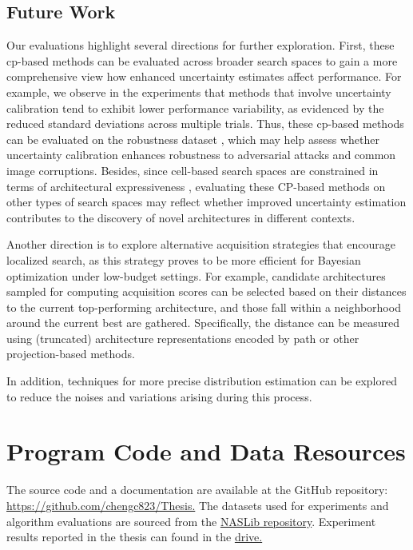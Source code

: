 \documentclass[a4paper,oneside,bibliography=totoc]{scrbook}
\begin{document}
\section{Future Work}
\label{sec: future_work}
Our evaluations highlight several directions for further exploration. First, these \gls{cp}-based methods can be evaluated across broader search spaces to gain a more comprehensive view how enhanced uncertainty estimates affect performance. For example, we observe in the experiments that methods that involve uncertainty calibration tend to exhibit lower performance variability, as evidenced by the reduced standard deviations across multiple trials. Thus, these \gls{cp}-based methods can be evaluated on the robustness dataset \cite{jung2023neural}, which may help assess whether uncertainty calibration enhances robustness to adversarial attacks and common image corruptions. Besides, since cell-based search spaces are constrained in terms of architectural expressiveness \cite{white2023survey}, evaluating these CP-based methods on other types of search spaces may reflect whether improved uncertainty estimation contributes to the discovery of novel architectures in different contexts.

Another direction is to explore alternative acquisition strategies that encourage localized search, as this strategy proves to be more efficient for Bayesian optimization under low-budget settings. For example, candidate architectures sampled for computing acquisition scores can be selected based on their distances to the current top-performing architecture, and those fall within a neighborhood around the current best are gathered. Specifically, the distance can be measured using (truncated) architecture representations encoded by path or other projection-based methods.

In addition, techniques for more precise distribution estimation can be explored to reduce the noises and variations arising during this process.





\listofalgorithms 
\listoffigures 
\listoftables
\printglossary[type=\acronymtype, title=Acronyms]

\appendix
\chapter{Program Code and Data Resources}
The source code and a documentation are available at the GitHub repository: \url{https://github.com/chengc823/Thesis.}
The datasets used for experiments and algorithm evaluations are sourced from the \href{https://github.com/automl/NASLib/tree/Develop}{NASLib repository}. Experiment results reported in the thesis can found in the \href{https://mega.nz/file/eAd0CR5A#wyrbKvIwBmjKLyFu54-1kNYsa4Z9gg6VSqNzcFrU7lg}{drive.}
\end{document}
